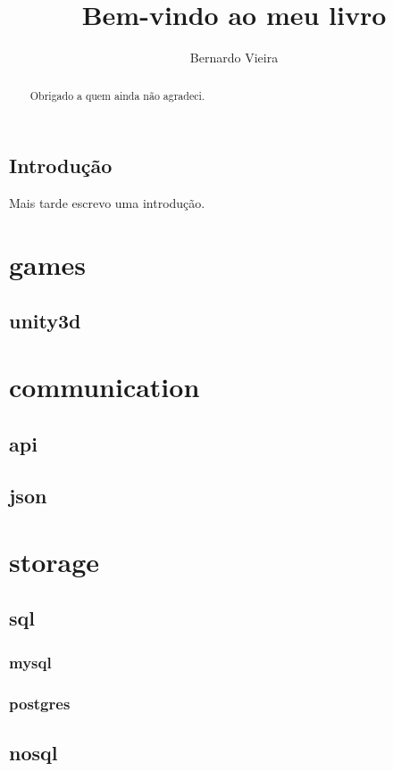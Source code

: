 \documentclass{report}
\begin{document}
\title{Bem-vindo ao meu livro}
\author{Bernardo Vieira}

\maketitle

\begin{abstract}
Obrigado a quem ainda não agradeci.
\end{abstract}

\section{Introdução}
Mais tarde escrevo uma introdução.

\chapter{games}
\section{unity3d}


\chapter{communication}
\section{api}
\section{json}

\chapter{storage}
\section{sql}
\subsection{mysql}
\subsection{postgres}

\section{nosql}
\end{document}
